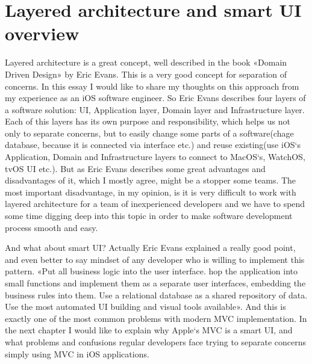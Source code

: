 \section{Layered architecture and smart UI overview}\label{sec:01}
    Layered architecture is a great concept, well described in the book «Domain Driven Design» by Eric Evans. This is a very good concept for separation of concerns. In this essay I would like to share my thoughts on this approach from my experience as an iOS software engineer. So Eric Evans describes four layers of a software solution: UI, Application layer, Domain layer and Infrastructure layer. Each of this layers has its own purpose and responsibility, which helps us not only to separate concerns, but to easily change some parts of a software(chage database, because it is connected via interface etc.) and reuse existing(use iOS`s Application, Domain and Infrastructure layers to connect to MacOS`s, WatchOS, tvOS UI etc.). But as Eric Evans  describes some great advantages and disadvantages of it, which I mostly agree, might be a stopper some teams. The most important disadvantage, in my opinion, is it is very difficult to work with layered architecture for a team of inexperienced developers and we have to spend some time digging deep into this topic in order to make software development process smooth and easy. 

	And what about smart UI? Actually Eric Evans explained a really good point, and even better to say mindset of any developer who is willing to implement this pattern. «Put all business logic into the user interface. hop the application into small functions and implement them as a separate user interfaces, embedding the business rules into them. Use a relational database as a shared repository of data. Use the most automated UI building and visual tools available». And this is exactly one of the most common problems with modern MVC implementation. In the next chapter I would like to explain why Apple`s MVC is a smart UI, and what problems  and confusions regular developers face trying to separate concerns simply using MVC in iOS applications.
